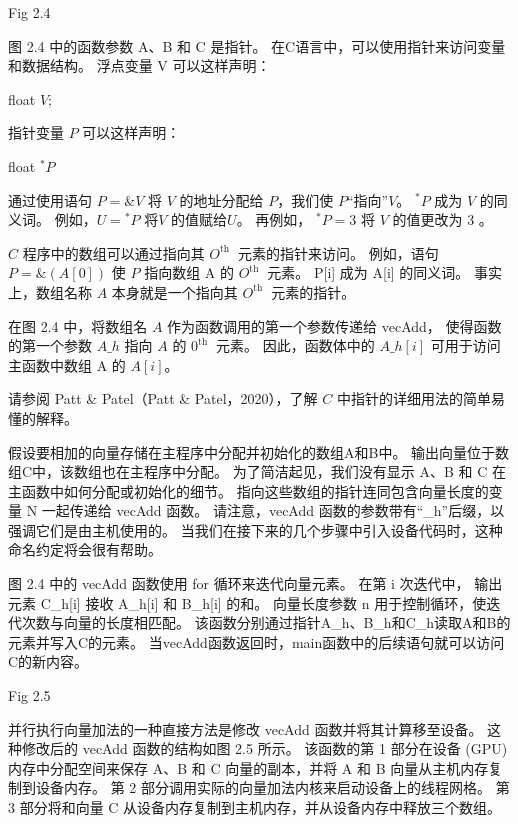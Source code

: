 {\color{red} Fig 2.4}

\begin{remark}[C语言中的指针]
	图 2.4 中的函数参数 A、B 和 C 是指针。 在C语言中，可以使用指针来访问变量和数据结构。 浮点变量 V 可以这样声明：
	
float $V$;

指针变量 $P$ 可以这样声明：

float ${ }^{*} P$

通过使用语句 $P=\& V$ 将 $V$ 的地址分配给 $P$，我们使 $P$“指向”$V$。 ${ }^{*} P$ 成为 $V$ 的同义词。 
例如，$U={ }^{*} P$ 将$V$ 的值赋给$U$。 再例如， ${ }^{*} P=3$ 将 $V$ 的值更改为 3 。

$C$ 程序中的数组可以通过指向其 $O^{\text {th }}$ 元素的指针来访问。 
例如，语句 $P=\&(A[0])$ 使 $P$ 指向数组 A 的 $O^{\text {th }}$ 元素。 
P[i] 成为 A[i] 的同义词。 事实上，数组名称 $A$ 本身就是一个指向其 $O^{\text {th }}$ 元素的指针。

在图 2.4 中，将数组名 $A$ 作为函数调用的第一个参数传递给 vecAdd，
使得函数的第一个参数 $A \_h$ 指向 $A$ 的 $0^{\text {th }}$ 元素。 
因此，函数体中的 $A \_h[i]$ 可用于访问主函数中数组 $\mathrm{A}$ 的 $A[i]$。

请参阅 Patt \& Patel（Patt \& Patel，2020），了解 $C$ 中指针的详细用法的简单易懂的解释。
\end{remark}

假设要相加的向量存储在主程序中分配并初始化的数组A和B中。 输出向量位于数组C中，该数组也在主程序中分配。 
为了简洁起见，我们没有显示 A、B 和 C 在主函数中如何分配或初始化的细节。 
指向这些数组的指针连同包含向量长度的变量 N 一起传递给 vecAdd 函数。 
请注意，vecAdd 函数的参数带有“\_h”后缀，以强调它们是由主机使用的。 
当我们在接下来的几个步骤中引入设备代码时，这种命名约定将会很有帮助。

图 2.4 中的 vecAdd 函数使用 for 循环来迭代向量元素。 在第 i 次迭代中，
输出元素 C\_h[i] 接收 A\_h[i] 和 B\_h[i] 的和。 向量长度参数 n 用于控制循环，使迭代次数与向量的长度相匹配。 
该函数分别通过指针A\_h、B\_h和C\_h读取A和B的元素并写入C的元素。 
当vecAdd函数返回时，main函数中的后续语句就可以访问C的新内容。

{\color{red} Fig 2.5}

并行执行向量加法的一种直接方法是修改 vecAdd 函数并将其计算移至设备。 这种修改后的 vecAdd 函数的结构如图 2.5 所示。 
该函数的第 1 部分在设备 (GPU) 内存中分配空间来保存 A、B 和 C 向量的副本，并将 A 和 B 向量从主机内存复制到设备内存。 
第 2 部分调用实际的向量加法内核来启动设备上的线程网格。 
第 3 部分将和向量 C 从设备内存复制到主机内存，并从设备内存中释放三个数组。

